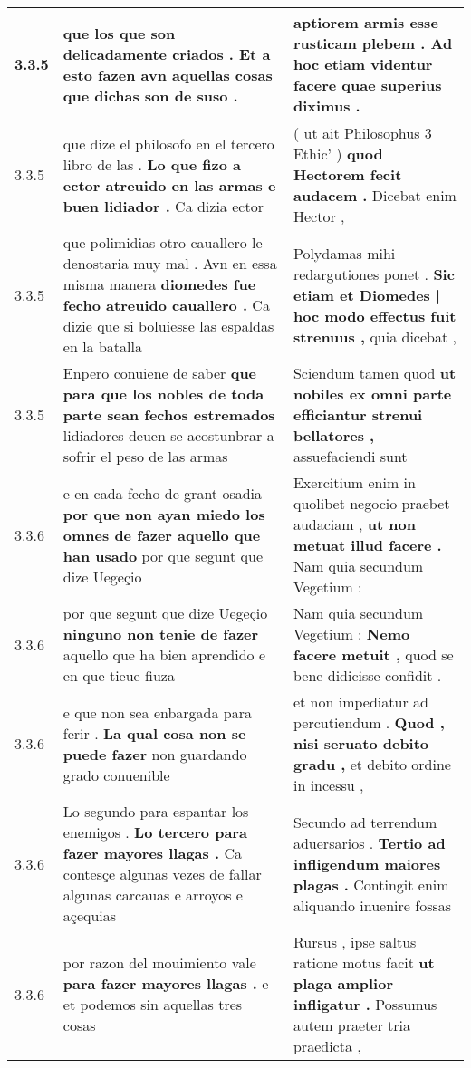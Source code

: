 \begin{tabular}{|p{1cm}|p{6.5cm}|p{6.5cm}|}
3.3.5 & que los que son delicadamente criados . \textbf{ Et a esto fazen avn aquellas cosas } que dichas son de suso . & aptiorem armis esse rusticam plebem . \textbf{ Ad hoc etiam videntur facere } quae superius diximus . \\\hline
3.3.5 & que dize el philosofo en el tercero libro de las . \textbf{ Lo que fizo a ector atreuido en las armas e buen lidiador . } Ca dizia ector & ( ut ait Philosophus 3 Ethic’ ) \textbf{ quod Hectorem fecit audacem . } Dicebat enim Hector , \\\hline
3.3.5 & que polimidias otro cauallero le denostaria muy mal . Avn en essa misma manera \textbf{ diomedes fue fecho atreuido cauallero . } Ca dizie que si boluiesse las espaldas en la batalla & Polydamas mihi redargutiones ponet . \textbf{ Sic etiam et Diomedes | hoc modo effectus fuit strenuus , } quia dicebat , \\\hline
3.3.5 & Enpero conuiene de saber \textbf{ que para que los nobles de toda parte sean fechos estremados } lidiadores deuen se acostunbrar a sofrir el peso de las armas & Sciendum tamen quod \textbf{ ut nobiles ex omni parte efficiantur strenui bellatores , } assuefaciendi sunt \\\hline
3.3.6 & e en cada fecho de grant osadia \textbf{ por que non ayan miedo los omnes de fazer aquello que han usado } por que segunt que dize Uegeçio & Exercitium enim in quolibet negocio praebet audaciam , \textbf{ ut non metuat illud facere . } Nam quia secundum Vegetium : \\\hline
3.3.6 & por que segunt que dize Uegeçio \textbf{ ninguno non tenie de fazer } aquello que ha bien aprendido e en que tieue fiuza & Nam quia secundum Vegetium : \textbf{ Nemo facere metuit , } quod se bene didicisse confidit . \\\hline
3.3.6 & e que non sea enbargada para ferir . \textbf{ La qual cosa non se puede fazer } non guardando grado conuenible & et non impediatur ad percutiendum . \textbf{ Quod , nisi seruato debito gradu , } et debito ordine in incessu , \\\hline
3.3.6 & Lo segundo para espantar los enemigos . \textbf{ Lo tercero para fazer mayores llagas . } Ca contesçe algunas vezes de fallar algunas carcauas e arroyos e açequias & Secundo ad terrendum aduersarios . \textbf{ Tertio ad infligendum maiores plagas . } Contingit enim aliquando inuenire fossas \\\hline
3.3.6 & por razon del mouimiento vale \textbf{ para fazer mayores llagas . } e et podemos sin aquellas tres cosas & Rursus , ipse saltus ratione motus facit \textbf{ ut plaga amplior infligatur . } Possumus autem praeter tria praedicta , \\\hline

\end{tabular}

